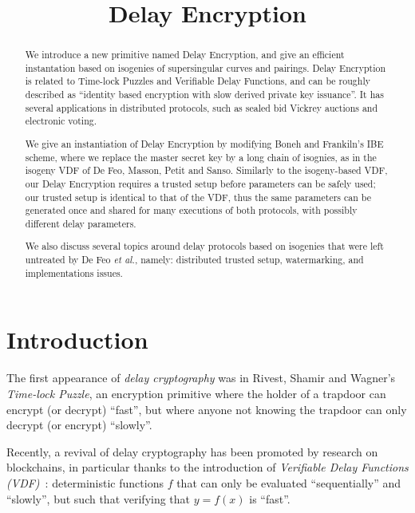 \documentclass{llncs}
\title{Delay Encryption}
\begin{document}
\maketitle

\begin{abstract}
  We introduce a new primitive named Delay Encryption, and give an
  efficient instantation based on isogenies of supersingular curves
  and pairings. %
  Delay Encryption is related to Time-lock Puzzles and Verifiable
  Delay Functions, and can be roughly described as ``identity based
  encryption with slow derived private key issuance''. %
  It has several applications in distributed protocols, such as
  sealed bid Vickrey auctions and electronic voting.

  We give an instantiation of Delay Encryption by modifying Boneh and
  Frankiln's IBE scheme, where we replace the master secret key by a
  long chain of isognies, as in the isogeny VDF of De Feo, Masson, 
  Petit and Sanso. %
  Similarly to the isogeny-based VDF, our Delay Encryption requires a
  trusted setup before parameters can be safely used; our trusted
  setup is identical to that of the VDF, thus the same parameters can
  be generated once and shared for many executions of both protocols,
  with possibly different delay parameters.

  We also discuss several topics around delay protocols
  based on isogenies that were left untreated by De Feo \emph{et al.},
  namely: distributed trusted setup, watermarking, and implementations
  issues.
\end{abstract}

\section{Introduction}
\label{sec:introduction}

The first appearance of \emph{delay cryptography} was in Rivest,
Shamir and Wagner's~\cite{TLP} \emph{Time-lock Puzzle}, an encryption
primitive where the holder of a trapdoor can encrypt (or decrypt)
``fast'', but where anyone not knowing the trapdoor can only decrypt
(or encrypt) ``slowly''.

Recently, a revival of delay cryptography has been promoted by
research on blockchains, in particular thanks to the introduction of
\emph{Verifiable Delay Functions (VDF)}~\cite{Boneh}: deterministic
functions $f$ that can only be evaluated  ``sequentially'' and ``slowly'',
but such that verifying that $y=f(x)$ is ``fast''. %
\end{document}
